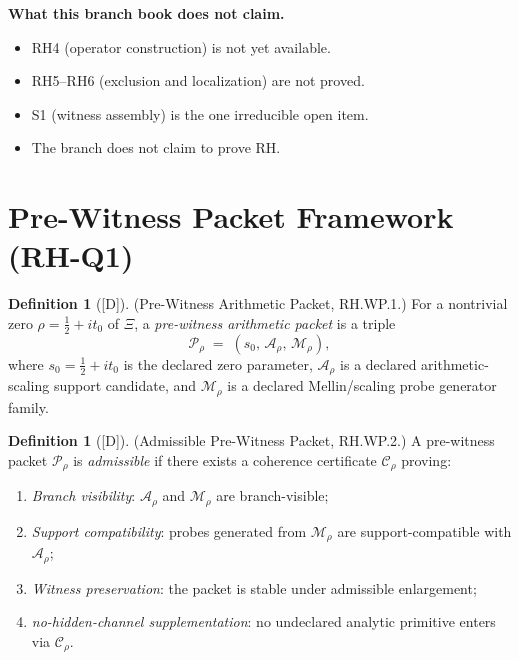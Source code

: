 \documentclass[12pt,oneside]{amsbook}
\theoremstyle{plain}
\theoremstyle{definition}
\newtheorem{definition}[theorem]{Definition}
\theoremstyle{remark}
\newcommand{\status}[1]{\textup{[#1]}}
\begin{document}
\textbf{What this branch book does not claim.}
\begin{itemize}
 \item RH4 (operator construction) is not yet available.
 \item RH5--RH6 (exclusion and localization) are not proved.
 \item S1 (witness assembly) is the one irreducible open item.
 \item The branch does not claim to prove RH.
\end{itemize}


\section{Pre-Witness Packet Framework (RH-Q1)}
\label{sec:rh-wp}

\begin{definition}[\status{D}]\label{def:rh-pre-witness-packet}
\textup{(Pre-Witness Arithmetic Packet, RH.WP.1.)}
For a nontrivial zero $\rho = \tfrac{1}{2}+it_0$ of $\Xi$, a
\emph{pre-witness arithmetic packet} is a triple
\[
 \mathcal{P}_\rho \;=\; (s_0,\,\mathcal{A}_\rho,\,\mathcal{M}_\rho),
\]
where $s_0 = \tfrac{1}{2}+it_0$ is the declared zero parameter,
$\mathcal{A}_\rho$ is a declared arithmetic-scaling support
candidate, and $\mathcal{M}_\rho$ is a declared Mellin/scaling
probe generator family.
\end{definition}

\begin{definition}[\status{D}]\label{def:rh-pre-witness-admissible}
\textup{(Admissible Pre-Witness Packet, RH.WP.2.)}
A pre-witness packet $\mathcal{P}_\rho$ is \emph{admissible} if
there exists a coherence certificate $\mathcal{C}_\rho$ proving:
\begin{enumerate}[label=\textup{(\arabic*)}]
 \item \emph{Branch visibility}: $\mathcal{A}_\rho$ and
 $\mathcal{M}_\rho$ are branch-visible;
 \item \emph{Support compatibility}: probes generated from
 $\mathcal{M}_\rho$ are support-compatible with $\mathcal{A}_\rho$;
 \item \emph{Witness preservation}: the packet is stable under
 admissible enlargement;
 \item \emph{no-hidden-channel supplementation}: no undeclared
 analytic primitive enters via $\mathcal{C}_\rho$.
\end{enumerate}
\end{definition}
\end{document}

